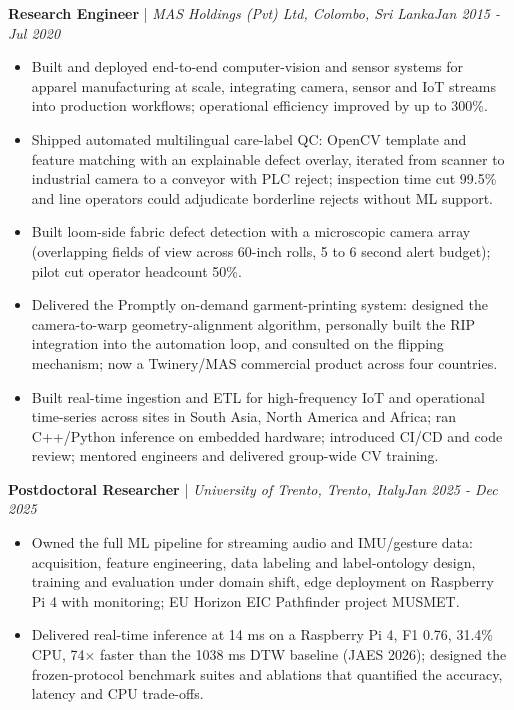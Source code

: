 \documentclass[11pt]{article}
\newenvironment{cvrole}[5]{%
  \par\noindent\textbf{\large #1} | \textit{\small #2, #3}\hfill \textit{\small #4 - #5}\par
  \begin{itemize}[leftmargin=2em, itemsep=-0.3em, topsep=-0.5em]%
}{%
  \end{itemize}\par\noindent\mbox{}\par\vspace{0.1em}%
}
\begin{document}
\begin{cvrole}{Research Engineer}{MAS Holdings (Pvt) Ltd}{Colombo, Sri Lanka}{Jan 2015}{Jul 2020}
    \item Built and deployed end-to-end computer-vision and sensor systems for apparel manufacturing at scale, integrating camera, sensor and IoT streams into production workflows; operational efficiency improved by up to 300\%.
    \item Shipped automated multilingual care-label QC: OpenCV template and feature matching with an explainable defect overlay, iterated from scanner to industrial camera to a conveyor with PLC reject; inspection time cut 99.5\% and line operators could adjudicate borderline rejects without ML support.
    \item Built loom-side fabric defect detection with a microscopic camera array (overlapping fields of view across 60-inch rolls, 5 to 6 second alert budget); pilot cut operator headcount 50\%.
    \item Delivered the Promptly on-demand garment-printing system: designed the camera-to-warp geometry-alignment algorithm, personally built the RIP integration into the automation loop, and consulted on the flipping mechanism; now a Twinery/MAS commercial product across four countries.
    \item Built real-time ingestion and ETL for high-frequency IoT and operational time-series across sites in South Asia, North America and Africa; ran C++/Python inference on embedded hardware; introduced CI/CD and code review; mentored engineers and delivered group-wide CV training.
\end{cvrole}

\begin{cvrole}{Postdoctoral Researcher}{University of Trento}{Trento, Italy}{Jan 2025}{Dec 2025}
    \item Owned the full ML pipeline for streaming audio and IMU/gesture data: acquisition, feature engineering, data labeling and label-ontology design, training and evaluation under domain shift, edge deployment on Raspberry Pi 4 with monitoring; EU Horizon EIC Pathfinder project MUSMET.
    \item Delivered real-time inference at 14 ms on a Raspberry Pi 4, F1 0.76, 31.4\% CPU, 74$\times$ faster than the 1038 ms DTW baseline (JAES 2026); designed the frozen-protocol benchmark suites and ablations that quantified the accuracy, latency and CPU trade-offs.
\end{cvrole}
\end{document}
